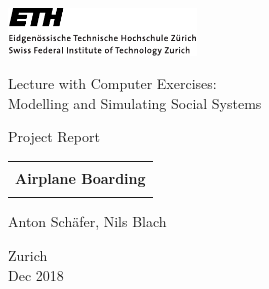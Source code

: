 
\thispagestyle{empty}

\begin{center}
\includegraphics[width=5cm]{ETHlogo.pdf}

\bigskip


\bigskip


\bigskip


\LARGE{ 	Lecture with Computer Exercises:\\ }
\LARGE{ Modelling and Simulating Social Systems\\}

\bigskip

\bigskip

\small{Project Report}\\

\bigskip

\bigskip

\bigskip

\bigskip


\begin{tabular}{|c|}
\hline
\\
\textbf{\LARGE{Airplane Boarding}}\\
\\
\hline
\end{tabular}
\bigskip

\bigskip

\bigskip

\LARGE{Anton Sch{\"a}fer, Nils Blach}



\bigskip

\bigskip

\bigskip

\bigskip

\bigskip

\bigskip

\bigskip

\bigskip

Zurich\\
Dec 2018\\

\end{center}



